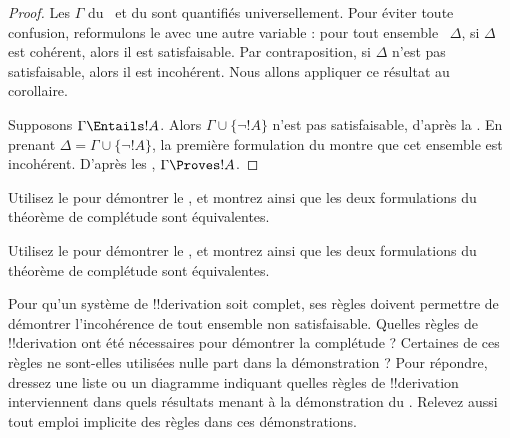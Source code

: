 \documentclass[../../../include/open-logic-section]{subfiles}
\begin{document}
\begin{proof}
Les $\Gamma$ du~ et du
 sont quantifiés universellement. Pour éviter
toute confusion, reformulons le  avec une autre
variable : pour tout ensemble ~$\Delta$, si $\Delta$
est cohérent, alors il est satisfaisable. Par contraposition, si
$\Delta$ n'est pas satisfaisable, alors il est incohérent. Nous allons
appliquer ce résultat au corollaire.

Supposons $\Gamma\Entails !A$. Alors
$\Gamma\cup\{\lnot !A\}$ n'est pas satisfaisable, d'après la
. En prenant
$\Delta=\Gamma\cup\{\lnot !A\}$, la première formulation du
 montre que cet ensemble est incohérent.
D'après les
,
$\Gamma\Proves !A$.
\end{proof}

\begin{prob}
Utilisez le  pour démontrer le
, et montrez ainsi que les deux
formulations du théorème de complétude sont équivalentes.
\end{prob}
\tagendprob

\begin{prob}
Utilisez le  pour démontrer le
, et montrez ainsi que les deux
formulations du théorème de complétude sont équivalentes.
\end{prob}
\tagendprob

\begin{prob}
Pour qu'un système de !!{derivation} soit complet, ses règles doivent
permettre de démontrer l'incohérence de tout ensemble non
satisfaisable. Quelles règles de !!{derivation} ont été nécessaires
pour démontrer la complétude ? Certaines de ces règles ne sont-elles
utilisées nulle part dans la démonstration ? Pour répondre, dressez
une liste ou un diagramme indiquant quelles règles de !!{derivation}
interviennent dans quels résultats menant à la démonstration du
. Relevez aussi tout emploi
implicite des règles dans ces démonstrations.
\end{prob}
\tagendprob
\end{document}
